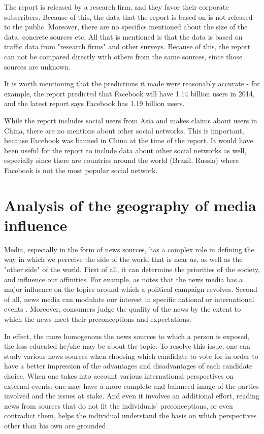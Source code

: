 \documentclass{acm_proc_10ptArticle-sp}
\begin{document}
The report is released by a research firm, and they favor their corporate subscribers. Because of this, the data that the report is based on is not released to the public. Moreover, there are no specifics mentioned about the size of the data, concrete sources etc. All that is mentioned is that the data is based on traffic data from "research firms" and other surveys. Because of this, the report can not be compared directly with others from the same sources, since those sources are unknown.

It is worth mentioning that the predictions it made were reasonably accurate - for example, the report predicted that Facebook will have 1.14 billion users in 2014, and the latest report says Facebook has 1.19 billion users.

While the report includes social users from Asia and makes claims about users in China, there are no mentions about other social networks. This is important, because Facebook was banned in China at the time of the report. It would have been useful for the report to include data about other social networks as well, especially since there are countries around the world (Brazil, Russia) where Facebook is not the most popular social network.


\section{Analysis of the geography of media influence}

Media, especially in the form of news sources, has a complex role in defining the way in which we perceive the side of the world that is near us, as well as the "other side" of the world. First of all, it can determine the priorities of the society, and influence our affinities. For example, as   notes that the news media has a major influence on the topics around which a political campaign revolves. Second of all, news media can modulate our interest in specific national or international events \cite{wanta2004agenda}. Moreover, consumers judge the quality of the news by the extent to which the news meet their preconceptions and expectations\cite{gentzkow2005media}. 

In effect, the more homogenous the news sources to which a person is exposed, the less educated he/she may be about the topic. To resolve this issue, one can study various news sources when choosing which candidate to vote for in order to have a better impression of the advantages and disadvantages of each candidate choice. When one takes into account various international perspectives on external events, one may have a more complete and balanced image of the parties involved and the issues at stake. And even it involves an additional effort, reading news from sources that do not fit the individuals' preconceptions, or even contradict them, helps the individual understand the basis on which perspectives other than his own are grounded.
\end{document}
